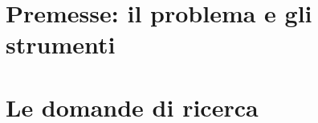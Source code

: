 \documentclass[12pt,a4paper,oneside,openany]{book}
\theoremstyle{definition}
\begin{document}
\cleardoublepage


\part{Premesse: il problema e gli strumenti}





\part{Le domande di ricerca}




\appendix


\cleardoublepage
{}

\end{document}
